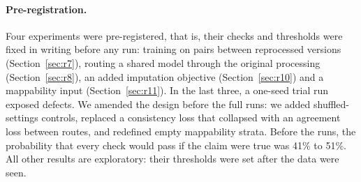 \documentclass[pdflatex,sn-mathphys-num]{sn-jnl}
\newcommand{\powJoint}{41}
\newcommand{\powPivot}{51}
\begin{document}
\paragraph{Pre-registration.} Four experiments were pre-registered, that is, their checks and
thresholds were fixed in writing before any run: training on pairs between reprocessed
versions (Section~\ref{sec:r7}), routing a shared model through the original processing
(Section~\ref{sec:r8}), an added imputation objective (Section~\ref{sec:r10}) and a
mappability input (Section~\ref{sec:r11}). In the last three, a one-seed trial run exposed
defects. We amended the design before the full runs: we added shuffled-settings controls,
replaced a consistency loss that collapsed with an agreement loss between routes, and
redefined empty mappability strata. Before the runs, the probability that every check would
pass if the claim were true was \powJoint\% to \powPivot\%. All other results are
exploratory: their thresholds were set after the data were seen.
\end{document}
